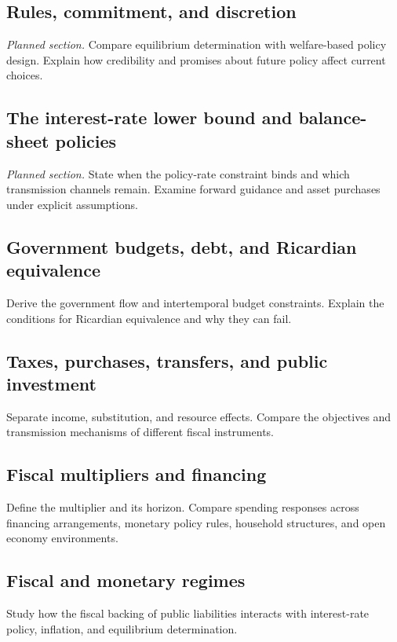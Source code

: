 \subsection[Rules, commitment, and discretion (planned)]{Rules, commitment, and discretion}
\textit{Planned section.} Compare equilibrium determination with welfare-based policy design.
Explain how credibility and promises about future policy affect current choices.

\subsection[The interest-rate lower bound and balance-sheet policies (planned)]{The interest-rate lower bound and balance-sheet policies}
\textit{Planned section.} State when the policy-rate constraint binds and which transmission channels
remain. Examine forward guidance and asset purchases under explicit assumptions.



\clearpage
{}\label{sec:fiscal-policy}

\subsection{Government budgets, debt, and Ricardian equivalence}
Derive the government flow and intertemporal budget constraints. Explain the
conditions for Ricardian equivalence and why they can fail.

\subsection{Taxes, purchases, transfers, and public investment}
Separate income, substitution, and resource effects. Compare the objectives
and transmission mechanisms of different fiscal instruments.

\subsection{Fiscal multipliers and financing}
Define the multiplier and its horizon. Compare spending responses across
financing arrangements, monetary policy rules, household structures, and
open economy environments.

\label{sec:policy-interaction}

\subsection{Fiscal and monetary regimes}
Study how the fiscal backing of public liabilities interacts with interest-rate
policy, inflation, and equilibrium determination.


